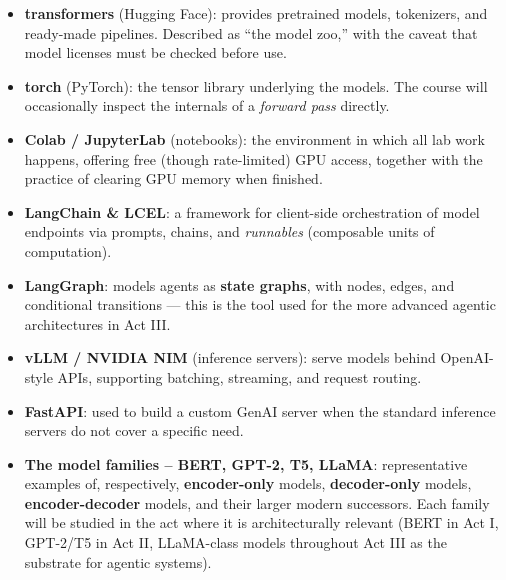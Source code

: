 \begin{itemize}
    \item \textbf{transformers} (Hugging Face): provides pretrained models, tokenizers, and ready-made pipelines. Described as ``the model zoo,'' with the caveat that model licenses must be checked before use.

    \vspace{0.2cm}
    \item \textbf{torch} (PyTorch): the tensor library underlying the models. The course will occasionally inspect the internals of a \emph{forward pass} directly.

    \vspace{0.2cm}
    \item \textbf{Colab / JupyterLab} (notebooks): the environment in which all lab work happens, offering free (though rate-limited) GPU access, together with the practice of clearing GPU memory when finished.

    \vspace{0.2cm}
    \item \textbf{LangChain \& LCEL}: a framework for client-side orchestration of model endpoints via prompts, chains, and \emph{runnables} (composable units of computation).

    \vspace{0.2cm}
    \item \textbf{LangGraph}: models agents as \textbf{state graphs}, with nodes, edges, and conditional transitions — this is the tool used for the more advanced agentic architectures in Act III.

    \vspace{0.2cm}
    \item \textbf{vLLM / NVIDIA NIM} (inference servers): serve models behind OpenAI-style APIs, supporting batching, streaming, and request routing.

    \vspace{0.2cm}
    \item \textbf{FastAPI}: used to build a custom GenAI server when the standard inference servers do not cover a specific need.

    \vspace{0.2cm}
    \item \textbf{The model families -- BERT, GPT-2, T5, LLaMA}: representative examples of, respectively, \textbf{encoder-only} models, \textbf{decoder-only} models, \textbf{encoder-decoder} models, and their larger modern successors. Each family will be studied in the act where it is architecturally relevant (BERT in Act I, GPT-2/T5 in Act II, LLaMA-class models throughout Act III as the substrate for agentic systems).
\end{itemize}


